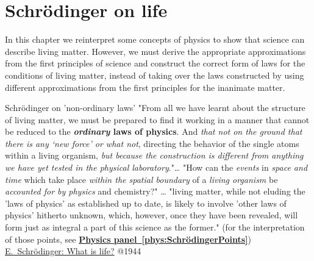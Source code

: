 
\section{Schrödinger on life\label{sec:Physics-SchrödingerOnLife}}

In this chapter we reinterpret some concepts of physics
to show that science can describe living matter.
However, we must derive the appropriate approximations
from the first principles of science
and construct the correct form of laws for the conditions
of living matter, 
instead of taking over the laws constructed by using
different approximations from the first principles 
for the inanimate matter.




{Schrödinger on 'non-ordinary laws'}
{
"From all we have learnt about the structure of living matter, we must be prepared to find it working in a manner that cannot be reduced to the \textbf{\textit{ordinary} laws of physics}.
And \textit{that not on the ground that there is any ‘new force’ or what not}, directing the behavior of the single atoms within a living organism, \textit{but because the construction is different from anything we have yet tested in the physical laboratory}."\dots 
"How can the \textit{events} in \textit{space and time} which take place \textit{within the spatial boundary} of a \textit{living organism} be \textit{accounted for by physics} and chemistry?" \dots
"living matter, while
not eluding the 'laws of physics' as established up to date, is likely to involve 'other laws of
physics' hitherto unknown, which, however, once
they have been revealed, will form just as
integral a part of this science as the former."
(for the interpretation of those points, see \hyperlink{phys:SchrödingerPoints}
{\textbf{Physics panel~\ref{phys:SchrödingerPoints}}})
\href{https://www.cambridge.org/core/books/abs/what-is-life/is-life-based-on-the-laws-of-physics/5BA8DE837F72FC4EEF70FE8470ADFE7B}{E.~Schrödinger: What is life?}\cite{Schrodinger:1992} @1944
}


